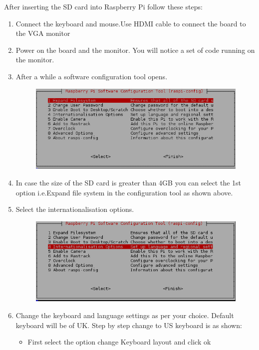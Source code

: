 \documentclass[11pt,a4paper]{report}
\begin{document}
	After inserting the SD card into Raspberry Pi follow these steps:
	\begin{enumerate}
		\item Connect the keyboard and mouse.Use HDMI cable to connect the board to the VGA monitor
		\item Power on the board and the monitor. You will notice a set of code running on the monitor.
		\item After a while a software configuration tool opens.
		
			\begin{figure}[h!]
				\includegraphics[scale=0.6]{2.PNG}
				\centering
				\caption{}
			\end{figure}
		\item In case the size of the SD card is greater than 4GB you can select the 1st option i.e.Expand file system in the configuration tool as shown above.	
		\item Select the internationalisation options.
			\begin{figure}[h!]
				\includegraphics[scale=0.6]{3.PNG}
				\centering
				\caption{}
			\end{figure}
		\item Change the keyboard and language settings as per your choice. Default keyboard will be of UK. Step by step change to US keyboard is as shown:
		\begin{itemize}
		\item First select the option change Keyboard layout and click ok

\end{itemize}
\end{enumerate}
\end{document}
